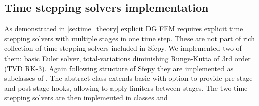 \subsection{Time stepping solvers implementation}
As demonstrated in \ref{se:time_theory} explicit DG FEM requires explicit time 
stepping solvers with multiple stages in one time step. These are not part of 
rich collection of time stepping solvers included in Sfepy. We implemented 
two of them: basic Euler solver, total-variations diminishing Runge-Kutta 
of 3rd order (TVD RK-3). 
Again following 
structure of Sfepy they are implemented as subclasses of 
. The abstract class  
extends basic  with option to provide pre-stage and 
post-stage hooks, allowing to apply limiters between stages. The two time stepping 
solvers are then implemented in classes  and 

